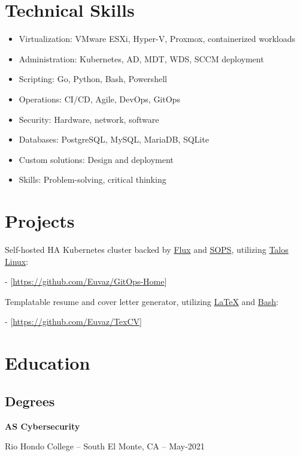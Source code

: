 \documentclass[a4paper]{article}
\begin{document}
\section{Technical Skills}
\begin{minipage}{\textwidth}
\begin{itemize}
    \item Virtualization: VMware ESXi, Hyper-V, Proxmox, containerized workloads
    \item Administration: Kubernetes, AD, MDT, WDS, SCCM deployment
    \item Scripting: Go, Python, Bash, Powershell
    \item Operations: CI/CD, Agile, DevOps, GitOps
    \item Security: Hardware, network, software
    \item Databases: PostgreSQL, MySQL, MariaDB, SQLite
    \item Custom solutions: Design and deployment
    \item Skills: Problem-solving, critical thinking
\end{itemize}
\end{minipage}

\section{Projects}
Self-hosted HA Kubernetes cluster backed by \href{https://toolkit.fluxcd.io}{Flux} and \href{https://toolkit.fluxcd.io/guides/mozilla-sops}{SOPS}, utilizing \href{https://www.talos.dev/}{Talos Linux}:\par
- [\url{https://github.com/Euvaz/GitOps-Home}]

\medskip
Templatable resume and cover letter generator, utilizing \href{https://www.latex-project.org/}{LaTeX} and \href{https://www.gnu.org/software/bash/}{Bash}:\par
- [\url{https://github.com/Euvaz/TexCV}]

\section{Education}
\subsection{Degrees}
\begin{minipage}{\textwidth}
\textbf{AS Cybersecurity}\par
Rio Hondo College -- South El Monte, CA -- May-2021
\end{minipage}
\end{document}
